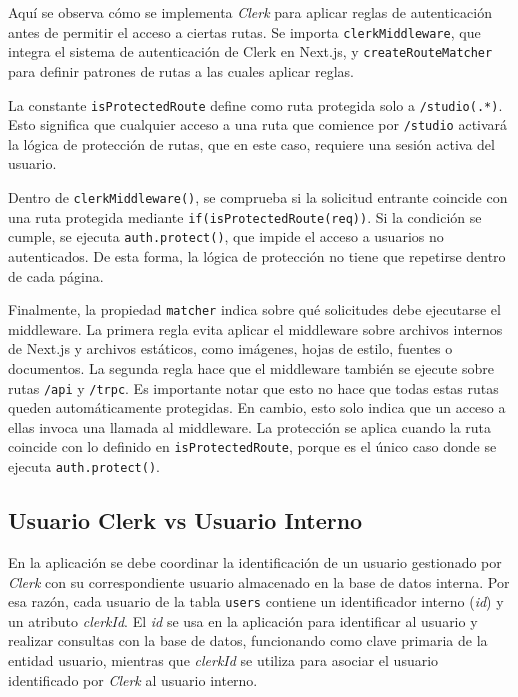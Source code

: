 Aquí se observa cómo se implementa \textit{Clerk} para aplicar reglas de autenticación antes de permitir el acceso a ciertas rutas. Se importa \texttt{clerkMiddleware}, que integra el sistema de autenticación de Clerk en Next.js, y \texttt{createRouteMatcher} para definir patrones de rutas a las cuales aplicar reglas.

La constante \texttt{isProtectedRoute} define como ruta protegida solo a \texttt{/studio(.*)}. Esto significa que cualquier acceso a una ruta que comience por \texttt{/studio} activará la lógica de protección de rutas, que en este caso, requiere una sesión activa del usuario.

Dentro de \texttt{clerkMiddleware()}, se comprueba si la solicitud entrante coincide con una ruta protegida mediante \texttt{if(isProtectedRoute(req))}. Si la condición se cumple, se ejecuta \texttt{auth.protect()}, que impide el acceso a usuarios no autenticados. De esta forma, la lógica de protección no tiene que repetirse dentro de cada página.

Finalmente, la propiedad \texttt{matcher} indica sobre qué solicitudes debe ejecutarse el middleware. La primera regla evita aplicar el middleware sobre archivos internos de Next.js y archivos estáticos, como imágenes, hojas de estilo, fuentes o documentos. La segunda regla hace que el middleware también se ejecute sobre rutas \texttt{/api} y \texttt{/trpc}. Es importante notar que esto no hace que todas estas rutas queden automáticamente protegidas. En cambio, esto solo indica que un acceso a ellas invoca una llamada al middleware. La protección se aplica cuando la ruta coincide con lo definido en \texttt{isProtectedRoute}, porque es el único caso donde se ejecuta \texttt{auth.protect()}.

\subsection{Usuario Clerk vs Usuario Interno}

En la aplicación se debe coordinar la identificación de un usuario gestionado por \textit{Clerk} con su correspondiente usuario almacenado en la base de datos interna. Por esa razón, cada usuario de la tabla \texttt{users} contiene un identificador interno (\textit{id}) y un atributo \textit{clerkId}. El \textit{id} se usa en la aplicación para identificar al usuario y realizar consultas con la base de datos, funcionando como clave primaria de la entidad usuario, mientras que \textit{clerkId} se utiliza para asociar el usuario identificado por \textit{Clerk} al usuario interno.

